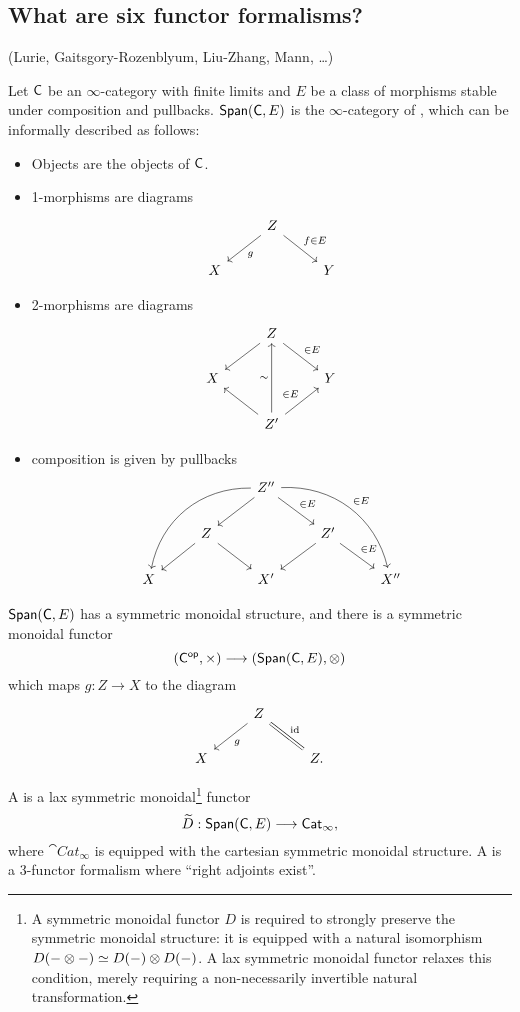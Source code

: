 \subsection{What are six functor formalisms?}
(Lurie, Gaitsgory-Rozenblyum, Liu-Zhang, Mann, \dots)

\begin{definition}[Fake]
Let $\mathsf{C}$ be an $\infty$-category with finite limits and $E$ be a class of morphisms
stable under composition and pullbacks. $\mathsf{Span}(\mathsf{C},E)$ is the $\infty$-category of
, which can be informally described as follows:
\begin{itemize}
\item Objects are the objects of $\mathsf{C}$.
\item 1-morphisms are diagrams
\[
\begin{tikzcd}
& Z \ar[dl,"g"] \ar[dr,"f\in E"] \\
X & & Y
\end{tikzcd}
\]
\item 2-morphisms are diagrams
\[
\begin{tikzcd}
& Z \ar[dl] \ar[dr,"\in E"] \\
X & & Y \\
& Z' \ar[lu] \ar[uu,"\sim"] \ar[ur,"\in E"]
\end{tikzcd}
\]
\item composition is given by pullbacks
\[
\begin{tikzcd}
& & Z'' \ar[ddll, bend right=40] \ar[dl] \ar[dr,"\in E"] \ar[ddrr,bend left=40,"\in E"] \\
& Z \ar[dl] \ar[dr] & & Z' \ar[dl] \ar[dr,"\in E"] \\
X & & X' & & X''
\end{tikzcd}
\]
\end{itemize}
\end{definition}
$\mathsf{Span}(\mathsf{C},E)$ has a symmetric monoidal structure, and there is a symmetric monoidal functor
\[
(\C\op,\times )\to (\cat{Span}(\C,E),\otimes)
\]
which maps $g:Z\to X$ to the diagram
\[
\begin{tikzcd}
& Z \ar[dl,"g"] \ar[dr,equals,"\id"] \\
X & & Z.
\end{tikzcd}
\]
\begin{definition}[Mann]
A  is a lax symmetric monoidal\footnote{A symmetric monoidal
functor $D$ is required to strongly preserve the symmetric monoidal structure: it is
equipped with a natural isomorphism $D(-\otimes-)\simeq D(-)\otimes D(-)$. A lax symmetric monoidal
functor relaxes this condition, merely requiring a non-necessarily invertible natural
transformation.} functor
\[
\wt{D}:\cat{Span}(\C,E) \to \cat{Cat}_\infty,
\]
where $\cat{Cat}_\infty$ is equipped with the cartesian symmetric monoidal structure. %
A  is a 3-functor formalism where ``right adjoints exist''.
\end{definition}
